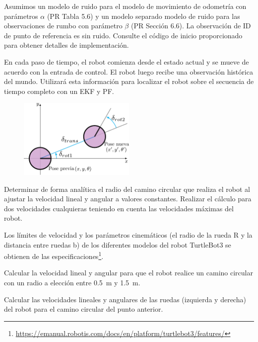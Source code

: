 \documentclass[tp]{lcc}
\begin{document}
	Asumimos un modelo de ruido para el modelo de movimiento de odometría con parámetros $\alpha$ (PR Tabla 5.6) y un modelo separado modelo de ruido para las observaciones de rumbo con parámetro $\beta$ (PR Sección 6.6). La observación de ID de punto de referencia es sin ruido. Consulte el código de inicio proporcionado para obtener detalles de implementación.
	
	En cada paso de tiempo, el robot comienza desde el estado actual y se mueve de acuerdo con la entrada de control. El robot luego recibe una observación histórica del mundo. Utilizará esta información para localizar el robot sobre el
	secuencia de tiempo completo con un EKF y PF.
	
	\begin{figure}[!htbp]
		\centering
		\includegraphics[width=0.5\textwidth]{./images/odometry_as_controls.pdf}
		\label{fig:odometry-base-motion-model}
	\end{figure}
	
	\ejercicio  Determinar de forma analítica el radio del camino circular que realiza el robot al ajustar la velocidad lineal y angular a valores constantes. Realizar el cálculo para dos velocidades cualquieras teniendo en cuenta las velocidades máximas del robot.
	
	\begin{nota}
		Los límites de velocidad y los parámetros cinemáticos (el radio de la rueda R y la distancia entre ruedas b) de los diferentes modelos del robot TurtleBot3 se obtienen de las especificaciones\footnote{\url{https://emanual.robotis.com/docs/en/platform/turtlebot3/features/}}.
	\end{nota}
	
	\ejercicio  Calcular la velocidad lineal y angular para que el robot realice un camino circular con un radio a elección entre \SI{0.5}{\meter} y \SI{1.5}{\meter}.
	
	\ejercicio  Calcular las velocidades lineales y angulares de las ruedas (izquierda y derecha) del robot para el camino circular del punto anterior.
	
\end{document}
